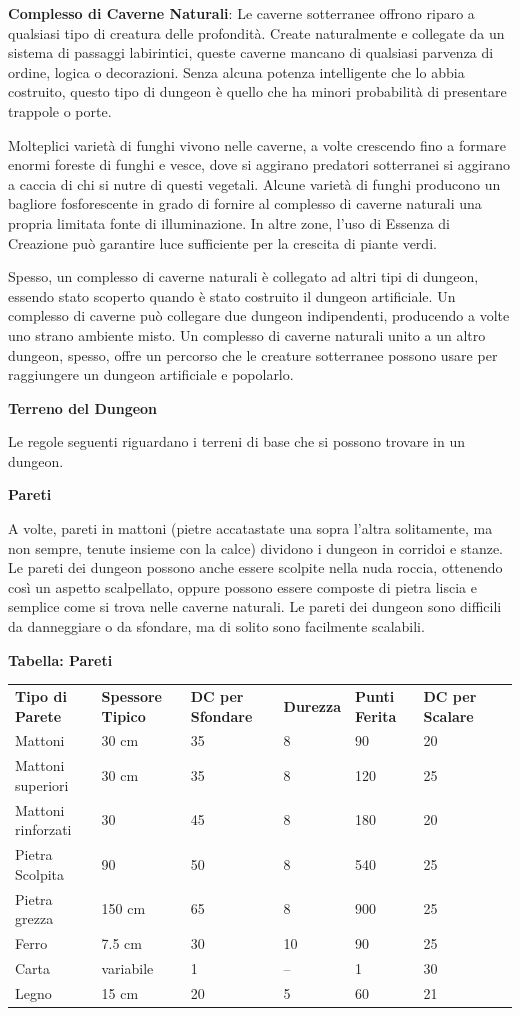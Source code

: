 \documentclass[a4paper,11pt,twoside,openany]{book}
\begin{document}
{\textbf{Complesso di Caverne Naturali}: Le caverne sotterranee offrono riparo a qualsiasi tipo di creatura delle profondità. Create naturalmente e collegate da un sistema di passaggi labirintici, queste caverne mancano di qualsiasi parvenza di ordine, logica o decorazioni. Senza alcuna potenza intelligente che lo abbia costruito, questo tipo di dungeon è quello che ha minori probabilità di presentare trappole o porte.

Molteplici varietà di funghi vivono nelle caverne, a volte crescendo fino a formare enormi foreste di funghi e vesce, dove si aggirano predatori sotterranei si aggirano a caccia di chi si nutre di questi vegetali. Alcune varietà di funghi producono un bagliore fosforescente in grado di fornire al complesso di caverne naturali una propria limitata fonte di illuminazione. In altre zone, l'uso di Essenza di Creazione può garantire luce sufficiente per la crescita di piante verdi.

Spesso, un complesso di caverne naturali è collegato ad altri tipi di dungeon, essendo stato scoperto quando è stato costruito il dungeon artificiale. Un complesso di caverne può collegare due dungeon indipendenti, producendo a volte uno strano ambiente misto. Un complesso di caverne naturali unito a un altro dungeon, spesso, offre un percorso che le creature sotterranee possono usare per raggiungere un dungeon artificiale e popolarlo.

\textbf{Terreno del Dungeon}

Le regole seguenti riguardano i terreni di base che si possono trovare in un dungeon.

\textbf{Pareti}

A volte, pareti in mattoni (pietre accatastate una sopra l'altra solitamente, ma non sempre, tenute insieme con la calce) dividono i dungeon in corridoi e stanze. Le pareti dei dungeon possono anche essere scolpite nella nuda roccia, ottenendo così un aspetto scalpellato, oppure possono essere composte di pietra liscia e semplice come si trova nelle caverne naturali. Le pareti dei dungeon sono difficili da danneggiare o da sfondare, ma di solito sono facilmente scalabili.

\bigskip

\textbf{Tabella: Pareti}
\medskip

\begin{tabular}{L{3cm}L{2.5cm}L{2cm}L{2cm}L{2cm}L{2.5cm}L{2cm}}
\toprule 
\textbf{Tipo di Parete} & \textbf{Spessore Tipico} & \textbf{DC per Sfondare} & \textbf{Durezza} & \textbf{Punti Ferita} & \textbf{DC per Scalare}\tabularnewline
Mattoni & 30 cm & 35 & 8 & 90 & 20\tabularnewline
Mattoni superiori & 30 cm & 35 & 8 & 120 & 25\tabularnewline
Mattoni rinforzati & 30 & 45 & 8 & 180 & 20\tabularnewline
Pietra Scolpita & 90 & 50 & 8 & 540 & 25\tabularnewline
Pietra grezza & 150 cm & 65 & 8 & 900 & 25\tabularnewline
Ferro & 7.5 cm & 30 & 10 & 90 & 25\tabularnewline
Carta & variabile & 1 & -- & 1 & 30\tabularnewline
Legno & 15 cm & 20 & 5 & 60 & 21\tabularnewline
\end{tabular}

}
\end{document}
